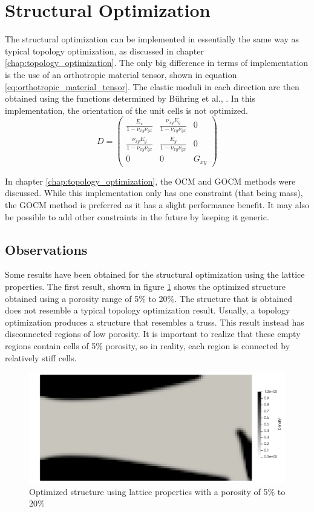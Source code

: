 \section{Structural Optimization}
The structural optimization can be implemented in essentially the same way as typical topology optimization, as discussed in chapter \ref{chap:topology_optimization}. The only big difference in terms of implementation is the use of an orthotropic material tensor, shown in equation \ref{eq:orthotropic_material_tensor}. The elastic moduli in each direction are then obtained using the functions determined by Bühring et al., \cite{Bühring_Soika_Schirp-Schoenen_Schröder_2022}. In this implementation, the orientation of the unit cells is not optimized.
\begin{equation}
  D = \begin{pmatrix} \frac{E_x}{1 - \nu_{xy}\nu_{yx}} & \frac{\nu_{xy}E_y}{1 - \nu_{xy}\nu_{yx}} & 0 \\ \frac{\nu_{xy}E_y}{1 - \nu_{xy}\nu_{yx}} & \frac{E_y}{1 - \nu_{xy}\nu_{yx}} & 0 \\ 0 & 0 & G_{xy} \end{pmatrix}
  \label{eq:orthotropic_material_tensor}
\end{equation}

In chapter \ref{chap:topology_optimization}, the OCM and GOCM methods were discussed. While this implementation only has one constraint (that being mass), the GOCM method is preferred as it has a slight performance benefit. It may also be possible to add other constraints in the future by keeping it generic. 

\subsection*{Observations}
Some results have been obtained for the structural optimization using the lattice properties. The first result, shown in figure \ref{fig:structural_opt_5to20} shows the optimized structure obtained using a porosity range of 5\% to 20\%. The structure that is obtained does not resemble a typical topology optimization result. Usually, a topology optimization produces a structure that resembles a truss. This result instead has disconnected regions of low porosity. It is important to realize that these empty regions contain cells of 5\% porosity, so in reality, each region is connected by relatively stiff cells.
\begin{figure}[ht]
  \centering
  \includegraphics[width=0.9\linewidth]{figures/chapter_4/StructuralOptLattice5to20.png}
  \caption{Optimized structure using lattice properties with a porosity of 5\% to 20\%}
  \label{fig:structural_opt_5to20}
\end{figure}

